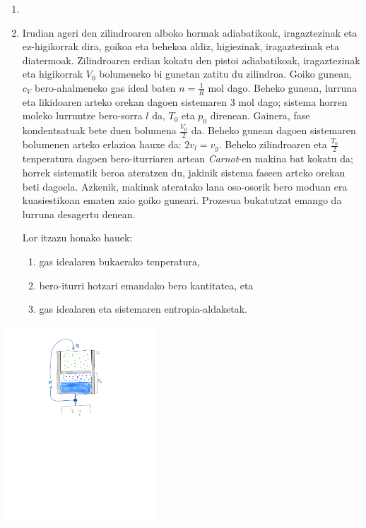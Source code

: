 \documentclass[10pt]{article}              %
\begin{document}
\begin{enumerate}
\item[]


\item Irudian ageri den zilindroaren alboko hormak adiabatikoak, iragaztezinak eta ez-higikorrak dira, goikoa eta behekoa aldiz, higiezinak, iragaztezinak eta diatermoak. Zilindroaren erdian kokatu den pistoi adiabatikoak, iragaztezinak eta higikorrak $V_{0}$ bolumeneko bi gunetan zatitu du zilindroa. Goiko gunean, $c_{V}$ bero-ahalmeneko gas ideal baten $n=\frac{1}{R}$ mol dago. Beheko gunean, lurruna eta likidoaren arteko orekan dagoen sistemaren 3 mol dago; sistema horren moleko lurruntze bero-sorra $l$ da, $T_{0}$ eta $p_{0}$ direnean. Gainera, fase kondentsatuak bete duen bolumena $\frac{V_{0}}{2}$ da. Beheko gunean dagoen sistemaren bolumenen arteko erlazioa hauxe da: $2v_{l}=v_{g}$. Beheko zilindroaren eta $\frac{T_{0}}{2}$ tenperatura dagoen bero-iturriaren artean \textit{Carnot}-en makina bat kokatu da; horrek sistematik beroa ateratzen du, jakinik sistema faseen arteko orekan beti dagoela. Azkenik, makinak ateratako lana oso-osorik bero moduan era kuasiestikoan ematen zaio goiko guneari. Prozesua bukatutzat emango da lurruna desagertu denean.

Lor itzazu honako hauek:
\begin{enumerate}
\item gas idealaren bukaerako tenperatura,
\item bero-iturri hotzari emandako bero kantitatea, eta
\item gas idealaren eta sistemaren entropia-aldaketak.
\end{enumerate}

\end{enumerate}

\begin{center}
\includegraphics[width=5.6cm]{11PAzterketaPartzialaIrudia.pdf}
\end{center}
\end{document}
